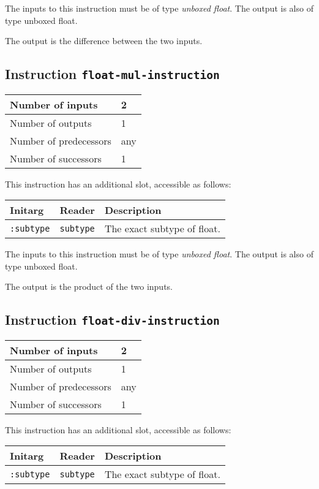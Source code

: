 The inputs to this instruction must be of type \emph{unboxed
  float}. The output is also of type unboxed float.

The output is the difference between the two inputs.

\subsection{Instruction \texttt{float-mul-instruction}}
\label{hir-instruction-float-mul}

\begin{tabular}{|l|l|}
\hline
Number of inputs & 2\\
\hline
Number of outputs & 1\\
\hline
Number of predecessors & any\\
\hline
Number of successors & 1\\
\hline
\end{tabular}

This instruction has an additional slot, accessible as follows:

\begin{tabular}{|l|l|l|}
  \hline
  Initarg & Reader & Description\\
  \hline\hline
  \texttt{:subtype} & \texttt{subtype} & The exact subtype of float.\\
  \hline
\end{tabular}

The inputs to this instruction must be of type \emph{unboxed
  float}. The output is also of type unboxed float.

The output is the product of the two inputs.

\subsection{Instruction \texttt{float-div-instruction}}
\label{hir-instruction-float-div}

\begin{tabular}{|l|l|}
\hline
Number of inputs & 2\\
\hline
Number of outputs & 1\\
\hline
Number of predecessors & any\\
\hline
Number of successors & 1\\
\hline
\end{tabular}

This instruction has an additional slot, accessible as follows:

\begin{tabular}{|l|l|l|}
  \hline
  Initarg & Reader & Description\\
  \hline\hline
  \texttt{:subtype} & \texttt{subtype} & The exact subtype of float.\\
  \hline
\end{tabular}

